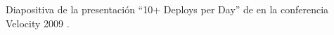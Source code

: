 \label{fig:devheartops}
Diapositiva de la presentación ``10+ Deploys per Day'' de
\citeauthor{flickr} en la conferencia Velocity 2009 \cite{flickr}.
